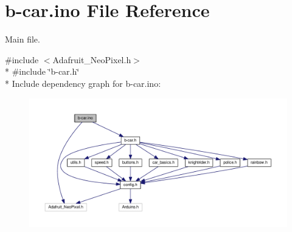 \hypertarget{b-car_8ino}{}\section{b-\/car.ino File Reference}
\label{b-car_8ino}


Main file.  


{\ttfamily \#include $<$Adafruit\+\_\+\+Neo\+Pixel.\+h$>$}\\*
{\ttfamily \#include \char`\"{}b-\/car.\+h\char`\"{}}\\*
Include dependency graph for b-\/car.ino\+:\nopagebreak
\begin{figure}[H]
\begin{center}
\leavevmode
\includegraphics[width=350pt]{b-car_8ino__incl}
\end{center}
\end{figure}
